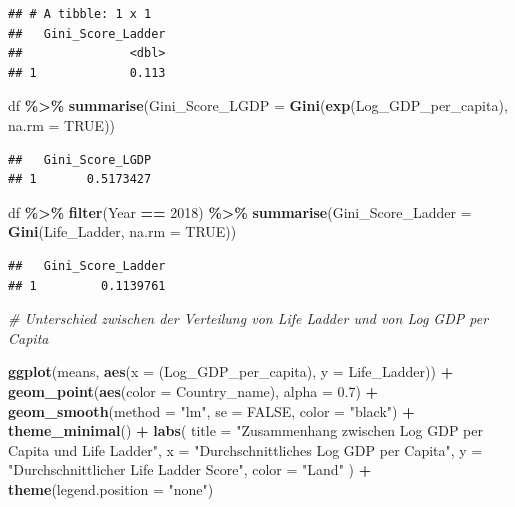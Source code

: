 \documentclass[
]{article}
\newenvironment{Shaded}{\begin{snugshade}}{\end{snugshade}}
\newcommand{\AttributeTok}[1]{\textcolor[rgb]{0.13,0.29,0.53}{#1}}
\newcommand{\CommentTok}[1]{\textcolor[rgb]{0.56,0.35,0.01}{\textit{#1}}}
\newcommand{\ConstantTok}[1]{\textcolor[rgb]{0.56,0.35,0.01}{#1}}
\newcommand{\DecValTok}[1]{\textcolor[rgb]{0.00,0.00,0.81}{#1}}
\newcommand{\FloatTok}[1]{\textcolor[rgb]{0.00,0.00,0.81}{#1}}
\newcommand{\FunctionTok}[1]{\textcolor[rgb]{0.13,0.29,0.53}{\textbf{#1}}}
\newcommand{\NormalTok}[1]{#1}
\newcommand{\SpecialCharTok}[1]{\textcolor[rgb]{0.81,0.36,0.00}{\textbf{#1}}}
\newcommand{\StringTok}[1]{\textcolor[rgb]{0.31,0.60,0.02}{#1}}
\begin{document}
\begin{verbatim}
## # A tibble: 1 x 1
##   Gini_Score_Ladder
##               <dbl>
## 1             0.113
\end{verbatim}

\begin{Shaded}
\begin{Highlighting}[]
\NormalTok{df }\SpecialCharTok{\%\textgreater{}\%} \FunctionTok{summarise}\NormalTok{(}\AttributeTok{Gini\_Score\_LGDP =} \FunctionTok{Gini}\NormalTok{(}\FunctionTok{exp}\NormalTok{(Log\_GDP\_per\_capita), }\AttributeTok{na.rm =} \ConstantTok{TRUE}\NormalTok{))}
\end{Highlighting}
\end{Shaded}

\begin{verbatim}
##   Gini_Score_LGDP
## 1       0.5173427
\end{verbatim}

\begin{Shaded}
\begin{Highlighting}[]
\NormalTok{df }\SpecialCharTok{\%\textgreater{}\%} \FunctionTok{filter}\NormalTok{(Year }\SpecialCharTok{==} \DecValTok{2018}\NormalTok{) }\SpecialCharTok{\%\textgreater{}\%} \FunctionTok{summarise}\NormalTok{(}\AttributeTok{Gini\_Score\_Ladder =} \FunctionTok{Gini}\NormalTok{(Life\_Ladder, }\AttributeTok{na.rm =} \ConstantTok{TRUE}\NormalTok{))}
\end{Highlighting}
\end{Shaded}

\begin{verbatim}
##   Gini_Score_Ladder
## 1         0.1139761
\end{verbatim}

\begin{Shaded}
\begin{Highlighting}[]
\CommentTok{\# Unterschied zwischen der Verteilung von Life Ladder und von Log GDP per Capita}


\FunctionTok{ggplot}\NormalTok{(means, }\FunctionTok{aes}\NormalTok{(}\AttributeTok{x =}\NormalTok{ (Log\_GDP\_per\_capita), }\AttributeTok{y =}\NormalTok{ Life\_Ladder)) }\SpecialCharTok{+}
  \FunctionTok{geom\_point}\NormalTok{(}\FunctionTok{aes}\NormalTok{(}\AttributeTok{color =}\NormalTok{ Country\_name), }\AttributeTok{alpha =} \FloatTok{0.7}\NormalTok{) }\SpecialCharTok{+}
  \FunctionTok{geom\_smooth}\NormalTok{(}\AttributeTok{method =} \StringTok{"lm"}\NormalTok{, }\AttributeTok{se =} \ConstantTok{FALSE}\NormalTok{, }\AttributeTok{color =} \StringTok{"black"}\NormalTok{) }\SpecialCharTok{+}
  \FunctionTok{theme\_minimal}\NormalTok{() }\SpecialCharTok{+}
  \FunctionTok{labs}\NormalTok{(}
    \AttributeTok{title =} \StringTok{"Zusammenhang zwischen Log GDP per Capita und Life Ladder"}\NormalTok{,}
    \AttributeTok{x =} \StringTok{"Durchschnittliches Log GDP per Capita"}\NormalTok{,}
    \AttributeTok{y =} \StringTok{"Durchschnittlicher Life Ladder Score"}\NormalTok{,}
    \AttributeTok{color =} \StringTok{"Land"}
\NormalTok{  ) }\SpecialCharTok{+} \FunctionTok{theme}\NormalTok{(}\AttributeTok{legend.position =} \StringTok{"none"}\NormalTok{)}
\end{Highlighting}
\end{Shaded}
\end{document}

